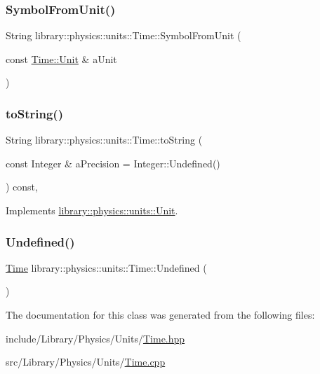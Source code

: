 \subsubsection{\texorpdfstring{Symbol\+From\+Unit()}{SymbolFromUnit()}}
{\footnotesize\ttfamily String library\+::physics\+::units\+::\+Time\+::\+Symbol\+From\+Unit (\begin{DoxyParamCaption}\item[{const \hyperlink{classlibrary_1_1physics_1_1units_1_1_time_ab876a6a05c9a2f28905f2753bfd64109}{Time\+::\+Unit} \&}]{a\+Unit }\end{DoxyParamCaption})\hspace{0.3cm}{\ttfamily [static]}}

\mbox{\label{classlibrary_1_1physics_1_1units_1_1_time_a6f56977493a45d334bb53bc4246888c4}} 
\subsubsection{\texorpdfstring{to\+String()}{toString()}}
{\footnotesize\ttfamily String library\+::physics\+::units\+::\+Time\+::to\+String (\begin{DoxyParamCaption}\item[{const Integer \&}]{a\+Precision = {\ttfamily Integer\+:\+:Undefined()} }\end{DoxyParamCaption}) const\hspace{0.3cm}{\ttfamily [override]}, {\ttfamily [virtual]}}



Implements \hyperlink{classlibrary_1_1physics_1_1units_1_1_unit_ad7364d457300e36413323c4aebce8029}{library\+::physics\+::units\+::\+Unit}.

\mbox{\label{classlibrary_1_1physics_1_1units_1_1_time_a532c992968408dcb70f5ee94e672c595}} 
\subsubsection{\texorpdfstring{Undefined()}{Undefined()}}
{\footnotesize\ttfamily \hyperlink{classlibrary_1_1physics_1_1units_1_1_time}{Time} library\+::physics\+::units\+::\+Time\+::\+Undefined (\begin{DoxyParamCaption}{ }\end{DoxyParamCaption})\hspace{0.3cm}{\ttfamily [static]}}



The documentation for this class was generated from the following files\+:\begin{DoxyCompactItemize}
\item 
include/\+Library/\+Physics/\+Units/\hyperlink{_units_2_time_8hpp}{Time.\+hpp}\item 
src/\+Library/\+Physics/\+Units/\hyperlink{_units_2_time_8cpp}{Time.\+cpp}\end{DoxyCompactItemize}
